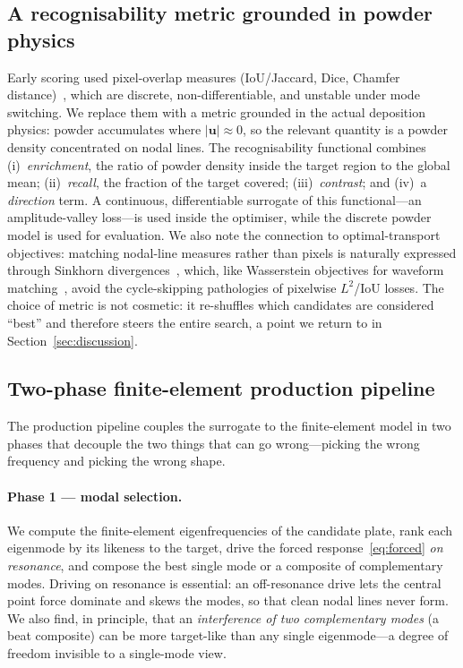 \documentclass[11pt,a4paper]{article}
\begin{document}
\subsection{A recognisability metric grounded in powder physics}\label{sec:metric}
Early scoring used pixel-overlap measures (IoU/Jaccard, Dice, Chamfer
distance)~\cite{jaccard1912,dice1945,barrow1977}, which are discrete,
non-differentiable, and unstable under mode switching. We replace them with a
metric grounded in the actual deposition physics: powder accumulates where
$|\bm{u}|\approx0$, so the relevant quantity is a powder density concentrated on
nodal lines. The recognisability functional combines (i)~\emph{enrichment}, the
ratio of powder density inside the target region to the global mean;
(ii)~\emph{recall}, the fraction of the target covered; (iii)~\emph{contrast}; and
(iv)~a \emph{direction} term. A continuous, differentiable surrogate of this
functional---an amplitude-valley loss---is used inside the optimiser, while the
discrete powder model is used for evaluation. We also note the connection to
optimal-transport objectives: matching nodal-line measures rather than pixels is
naturally expressed through Sinkhorn divergences~\cite{cuturi2013}, which, like
Wasserstein objectives for waveform matching~\cite{engquist2014}, avoid the
cycle-skipping pathologies of pixelwise $L^2$/IoU losses. The choice of metric is
not cosmetic: it re-shuffles which candidates are considered ``best'' and
therefore steers the entire search, a point we return to in
Section~\ref{sec:discussion}.

\subsection{Two-phase finite-element production pipeline}\label{sec:pipeline}
The production pipeline couples the surrogate to the finite-element model in two
phases that decouple the two things that can go wrong---picking the wrong
frequency and picking the wrong shape.

\paragraph{Phase 1 — modal selection.}
We compute the finite-element eigenfrequencies of the candidate plate, rank each
eigenmode by its likeness to the target, drive the forced
response~\eqref{eq:forced} \emph{on resonance}, and compose the best single mode
or a composite of complementary modes. Driving on resonance is essential: an
off-resonance drive lets the central point force dominate and skews the modes, so
that clean nodal lines never form. We also find, in principle, that an
\emph{interference of two complementary modes} (a beat composite) can be more
target-like than any single eigenmode---a degree of freedom invisible to a
single-mode view.
\end{document}
